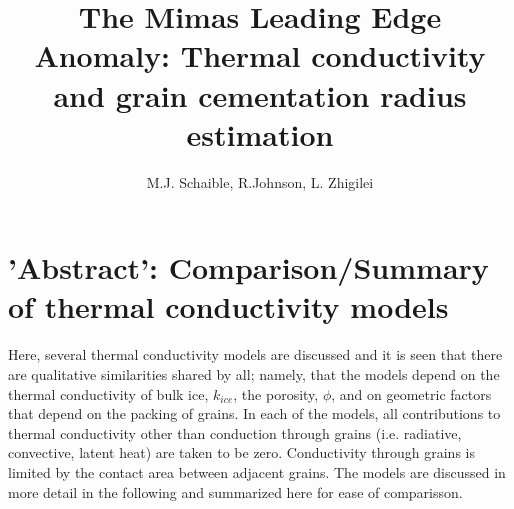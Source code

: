\documentclass[11pt]{article} %
\title{The Mimas Leading Edge Anomaly: Thermal conductivity and grain cementation radius estimation}
\author{M.J. Schaible, R.Johnson, L. Zhigilei}
\begin{document}
\maketitle

\section{'Abstract': Comparison/Summary of thermal conductivity models}

	Here, several thermal conductivity models are discussed and it is seen that there are qualitative similarities shared by all; namely, that the models depend on the thermal conductivity of bulk ice, $k_{ice}$, the porosity, $\phi$, and on geometric factors that depend on the packing of grains. In each of the models, all contributions to thermal conductivity  other than conduction through grains (i.e. radiative, convective, latent heat) are taken to be zero. Conductivity through grains is limited by the contact area between adjacent grains. The models are discussed in more detail in the following and summarized here for ease of comparisson.
	
\end{document}
